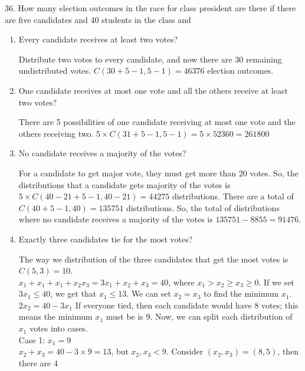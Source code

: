 \documentclass[12pt]{article}
\begin{document}
36. How many election outcomes in the race for class president are there 
if there are five candidates and 40 students in the class and
\begin{enumerate}[label=(\alph*)]
    \item Every candidate receives at least two votes?
    \begin{solution}
        Distribute two votes to every candidate, and now there are 
        30 remaining undistributed votes. $C(30+5-1, 5-1)=46376$ 
        election outcomes. 
    \end{solution}
    \item One candidate receives at most one vote and all the others 
    receive at least two votes?
    \begin{solution}
        There are 5 possibilities of one candidate receiving at most one 
        vote and the others receiving two. 
        $5\times C(31+5-1, 5-1)=5\times52360=261800$
    \end{solution}
    \item No candidate receives a majority of the votes?
    \begin{solution}
        For a candidate to get major vote, they must get more than 20 
        votes. So, the distributions that a candidate gets majority 
        of the votes is $5\times C(40-21 + 5 - 1, 40-21)=44275$ 
        distributions. There are a total of $C(40 + 5-1, 40)=135751$ 
        distributions. So, the total of distributions where no 
        candidate receives a majority of the votes is $135751-8855=91476$.
    \end{solution}
    \item Exactly three candidates tie for the most votes?
    \begin{solution}
        The way we distribution of the three candidates that get the most
        votes is $C(5, 3) = 10$. \\
        $x_1 + x_1 + x_1 + x_2 x_3 = 3x_1 + x_2 +x_3 = 40$, 
        where $x_1 > x_2 \ge x_3 \ge 0$. If we set $3x_1 \le 40$, we get 
        that $x_1 \le 13$. We can set $x_2 = x_3$ to find
        the minimum $x_1$. $2x_2 = 40-3x_1$ If everyone tied, then each 
        candidate would have 8 votes; this means the minimum $x_1$ must 
        be is 9. Now, we can split each distribution of $x_1$ votes into 
        cases. \\
        Case 1: $x_1 = 9$ \\
        $x_2 + x_3 = 40-3\times9 = 13$, but $x_2, x_3 < 9$. 
        Consider $(x_2, x_3) = (8, 5)$, then there are 4 

\end{solution}
\end{enumerate}
\end{document}
